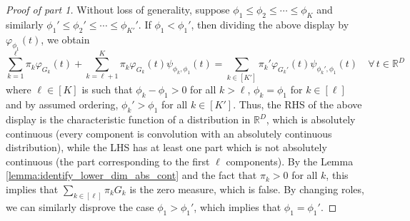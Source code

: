 \documentclass[bj,authoryear]{imsart}
\theoremstyle{plain}
\theoremstyle{remark}
\def\bbR{\mathbb{R}}
\begin{document}
\begin{appendix}
\begin{proof}[Proof of part 1]
     Without loss of generality, suppose $\phi_1\leq \phi_2\leq\cdots\leq \phi_K$ and similarly $\phi_1'\leq \phi_2'\leq\cdots\leq \phi_{K'}'$. If $\phi_1<\phi_1'$, then dividing the above display by $\varphi_{\phi_1}(t)$, we obtain
     $$\sum_{k=1}^{\ell} \pi_k\varphi_{G_k}(t) + \sum_{k=\ell+1}^{K} \pi_k \varphi_{G_k}(t)\psi_{\phi_k, \phi_1}(t) = \sum_{k\in[K']} \pi_k' \varphi_{G_k'}(t)\psi_{\phi_k',\phi_1}(t)\quad \forall\, t\in\bbR^D$$
     where $\ell\in[K]$ is such that $\phi_k-\phi_1 > 0$ for all $k>\ell$, $\phi_k=\phi_1$ for $k\in[\ell]$ and by assumed ordering, $\phi_k'>\phi_1$ for all $k\in[K']$. Thus, the RHS of the above display is the characteristic function of a distribution in $\bbR^D$, which is absolutely continuous (every component is convolution with an absolutely continuous distribution), while the LHS has at least one part which is not absolutely continuous (the part corresponding to the first $\ell$ components). By the Lemma \ref{lemma:identify_lower_dim_abs_cont} and the fact that $\pi_k>0$ for all $k$, this implies that $\sum_{k\in[\ell]} \pi_k G_k$ is the zero measure, which is false. By changing roles, we can similarly disprove the case $\phi_1>\phi_1'$, which implies that $\phi_1=\phi_1'$.


\end{proof}
\end{appendix}
\end{document}
